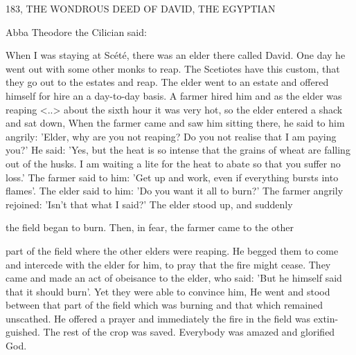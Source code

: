183, THE WONDROUS DEED OF DAVID,
THE EGYPTIAN

Abba Theodore the Cilician said:

When I was staying at Scété, there was an elder there called David.
One day he went out with some other monks to reap.
The Scetiotes
have this custom, that they go out to the estates and reap.
The elder
went to an estate and offered himself for hire an a day-to-day basis.
A farmer hired him and as the elder was reaping <..> about the
sixth hour it was very hot, so the elder entered a shack and sat
down, When the farmer came and saw him sitting there, he said to
him angrily: 'Elder, why are you not reaping? Do you not realise
that I am paying you?' He said: 'Yes, but the heat is so intense that
the grains of wheat are falling out of the husks.
I am waiting a lite
for the heat to abate so that you suffer no loss.' The farmer said to
him: 'Get up and work, even if everything bursts into flames'.
The
elder said to him: 'Do you want it all to burn?' The farmer angrily
rejoined: 'Isn't that what I said?' The elder stood up, and suddenly

the field began to burn.
Then, in fear, the farmer came to the other

part of the field where the other elders were reaping.
He begged
them to come and intercede with the elder for him, to pray that the
fire might cease.
They came and made an act of obeisance to the
elder, who said: 'But he himself said that it should burn'.
Yet they
were able to convince him, He went and stood between that part of
the field which was burning and that which remained unscathed.
He
offered a prayer and immediately the fire in the field was extin-
guished.
The rest of the crop was saved.
Everybody was amazed and
glorified God.

